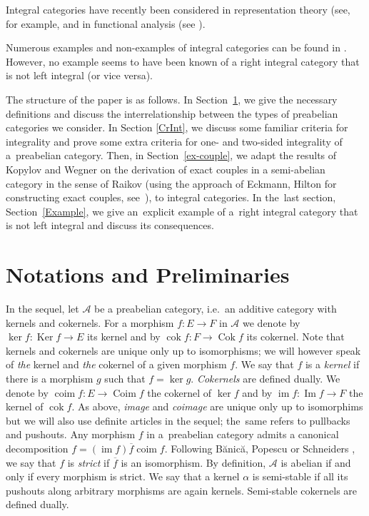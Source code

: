 \documentclass[a4paper,10pt,reqno]{amsart}
\renewcommand{\bar}{\overline}
\newcommand{\Ker}{\operatorname{Ker}\nolimits}
\newcommand{\Cok}{\operatorname{Cok}\nolimits}
\newcommand{\cok}{\operatorname{cok}\nolimits}
\renewcommand{\Im}{\operatorname{Im}\nolimits}
\newcommand{\im}{\operatorname{im}\nolimits}
\newcommand{\coim}{\operatorname{coim}\nolimits}
\newcommand{\Coim}{\operatorname{Coim}\nolimits}
\begin{document}
	Integral categories have recently been considered in representation theory (see, for example, \cite{BrHasTat2021, BuanMarsh2012, Nakaoka2013} and in functional analysis (see
	\cite{HSW2021, LawsonWegner2023}).
	
	Numerous examples and non-examples of integral categories can be found in \cite{HSW2021}. However, no example seems to have been known of a right integral category that is not left integral (or vice versa).  
	
	The structure of the paper is as follows. In Section~\ref{Prep}, 
	we give the necessary definitions and discuss the interrelationship between the types of preabelian categories we consider. In Section \ref{CrInt}, we discuss some familiar criteria for integrality and prove some extra criteria for one- and two-sided integrality of a~preabelian category. Then, in Section~\ref{ex-couple}, we adapt the results of Kopylov and Wegner \cite{KW2} on the derivation of exact couples in a semi-abelian category in the sense of Raikov (using the approach of Eckmann, Hilton \cite{EH} for constructing exact couples, see~\cite{M}), to integral categories. In the~last section, Section~\ref{Example}, we give an~explicit example of a~right integral category that is not left integral and discuss its consequences.
	
	\section{Notations and Preliminaries}\label{Prep}\vspace{-5pt}
	
	In the sequel, let $\mathcal{A}$ be a preabelian category, i.e.~an additive category with kernels and cokernels. For a morphism $f\colon E\rightarrow F$ in $\mathcal{A}$ we denote by $\ker f\colon \Ker f\rightarrow E$ its kernel and by $\cok f\colon F \rightarrow \Cok f$ its cokernel. Note that kernels and cokernels are unique only up to isomorphisms; we will however speak of \textit{the} kernel and \textit{the} cokernel of a given morphism $f$. We say that $f$ is a \textit{kernel} if there is a morphism $g$ such that $f=\ker g$. \textit{Cokernels} are defined dually. We denote by $\coim f\colon E\rightarrow \Coim f$ the cokernel of $\ker f$ and by $\im f\colon\Im f\rightarrow F$ the kernel of $\cok f$. As above, \textit{image} and \textit{coimage} are unique only up to isomorphims but we will also use definite articles in the sequel; the~same refers to pullbacks and pushouts. Any morphism $f$ in a~preabelian category admits a canonical decomposition $f=(\im f)\bar{f}\coim f$. Following B\u{a}nic\u{a}, Popescu \cite{BanicaPopescu1965} or Schneiders \cite[Definition 1.1.1]{Schneiders1999}, we say that $f$ is \textit{strict} if $\bar{f}$ is an isomorphism. By definition, $\mathcal{A}$ is abelian if and only if every morphism is strict.
	We say that a kernel $\alpha$ is semi-stable if all its pushouts along arbitrary morphisms are again kernels. Semi-stable cokernels are defined dually.
	
\end{document}
